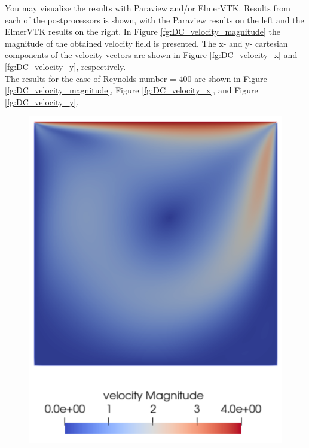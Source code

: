 You may visualize the results with Paraview and/or ElmerVTK.  Results from each of the postprocessors
is shown, with the Paraview results on the left and the ElmerVTK results on the right.
In Figure \ref{fg:DC_velocity_magnitude} the magnitude of the obtained velocity field is presented.
The x- and y- cartesian components of the velocity vectors are shown in Figure \ref{fg:DC_velocity_x} and \ref{fg:DC_velocity_y}, respectively.\\

The results for the case of Reynolds number = 400 are shown in Figure \ref{fg:DC_velocity_magnitude},
Figure \ref{fg:DC_velocity_x}, and Figure \ref{fg:DC_velocity_y}.


\begin{figure}[H]
\centering
\includegraphics[scale=0.27]{DC_velocity_magnitude}

\end{figure}
